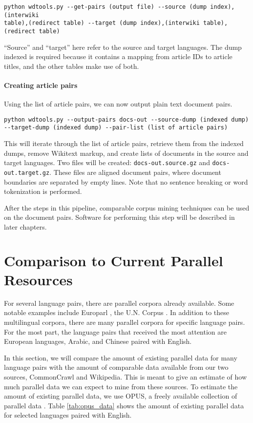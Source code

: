 \begin{verbatim}
python wdtools.py --get-pairs (output file) --source (dump index),(interwiki
table),(redirect table) --target (dump index),(interwiki table),(redirect table)
\end{verbatim}

``Source'' and ``target'' here refer to the source and target languages. The
dump indexed is required because it contains a mapping from article IDs to
article titles, and the other tables make use of both.

\paragraph{Creating article pairs}

Using the list of article pairs, we can now output plain text document pairs.

\begin{verbatim}
python wdtools.py --output-pairs docs-out --source-dump (indexed dump)
--target-dump (indexed dump) --pair-list (list of article pairs)
\end{verbatim}

This will iterate through the list of article pairs, retrieve them from the
indexed dumps, remove Wikitext markup, and create lists of documents in the
source and target languages. Two files will be created: {\tt docs-out.source.gz}
and {\tt docs-out.target.gz}. These files are aligned document pairs, where
document boundaries are separated by empty lines. Note that no sentence breaking
or word tokenization is performed.

After the steps in this pipeline, comparable corpus mining techniques can be
used on the document pairs. Software for performing this step will be described
in later chapters.

\section{Comparison to Current Parallel Resources}
For several language pairs, there are parallel corpora already available. Some
notable examples include Europarl \citep{Koehn05}, the U.N. Corpus
\citep{MultiUN}. In addition to these
multilingual corpora, there are many parallel corpora for specific language
pairs. For the most part, the language pairs that received the most attention
are European languages, Arabic, and Chinese paired with English.

In this section, we will compare the amount of existing parallel data for many
language pairs with the amount of comparable data available from our two
sources, CommonCrawl and Wikipedia. This is meant to give an estimate of how
much parallel data we can expect to mine from these sources. To estimate the
amount of existing parallel data, we use OPUS, a freely available collection of
parallel data \citep{OPUS}. Table \ref{tab:opus_data} shows the amount of existing
parallel data for selected languages paired with English. 

